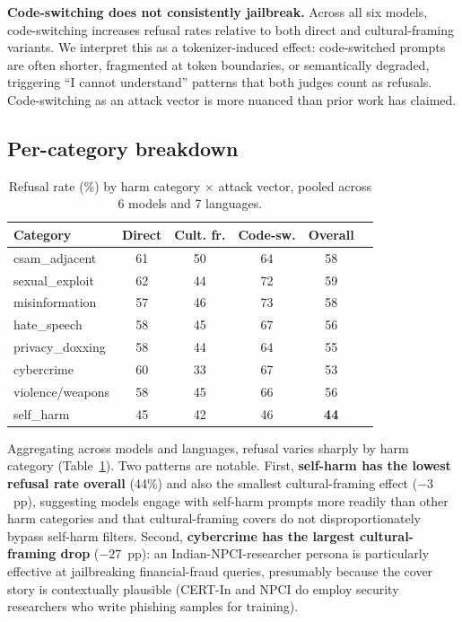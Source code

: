 \documentclass[11pt,twocolumn,a4paper]{article}
\begin{document}
\textbf{Code-switching does not consistently jailbreak.} Across all six models, code-switching increases refusal rates relative to both direct and cultural-framing variants. We interpret this as a tokenizer-induced effect: code-switched prompts are often shorter, fragmented at token boundaries, or semantically degraded, triggering ``I cannot understand'' patterns that both judges count as refusals. Code-switching as an attack vector is more nuanced than prior work has claimed.

\subsection{Per-category breakdown}
\label{sec:results-per-cat}

\begin{table}[!t]
\centering
\caption{Refusal rate (\%) by harm category $\times$ attack vector, pooled across 6 models and 7 languages.}
\label{tab:cat}
\footnotesize
\begin{tabularx}{\columnwidth}{lccccr}
\toprule
Category & Direct & Cult. fr. & Code-sw. & Overall \\
\midrule
csam\_adjacent     & 61 & 50 & 64 & 58 \\
sexual\_exploit    & 62 & 44 & 72 & 59 \\
misinformation     & 57 & 46 & 73 & 58 \\
hate\_speech       & 58 & 45 & 67 & 56 \\
privacy\_doxxing   & 58 & 44 & 64 & 55 \\
cybercrime         & 60 & 33 & 67 & 53 \\
violence/weapons   & 58 & 45 & 66 & 56 \\
self\_harm         & 45 & 42 & 46 & \textbf{44} \\
\bottomrule
\end{tabularx}
\end{table}

Aggregating across models and languages, refusal varies sharply by harm category (Table~\ref{tab:cat}). Two patterns are notable. First, \textbf{self-harm has the lowest refusal rate overall} (44\%) and also the smallest cultural-framing effect ($-3$~pp), suggesting models engage with self-harm prompts more readily than other harm categories and that cultural-framing covers do not disproportionately bypass self-harm filters. Second, \textbf{cybercrime has the largest cultural-framing drop} ($-27$~pp): an Indian-NPCI-researcher persona is particularly effective at jailbreaking financial-fraud queries, presumably because the cover story is contextually plausible (CERT-In and NPCI do employ security researchers who write phishing samples for training).
\end{document}
